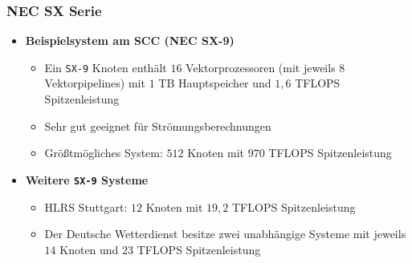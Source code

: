 \subsubsection{NEC SX Serie}
\begin{itemize}
	\item \textbf{Beispielsystem am SCC (NEC SX-9)}
	\begin{itemize}
		\item Ein \texttt{SX-9} Knoten enthält \(16\) Vektorprozessoren (mit jeweils \(8\) Vektorpipelines) mit \(1\) TB Hauptspeicher und \(1,6\) TFLOPS Spitzenleistung
		\item Sehr gut geeignet für Strömungsberechnungen
		\item Größtmögliches System: \(512\) Knoten mit \(970\) TFLOPS Spitzenleistung
	\end{itemize}
	\item \textbf{Weitere \texttt{SX-9} Systeme}
	\begin{itemize}
		\item HLRS Stuttgart: \(12\) Knoten mit \(19,2\) TFLOPS Spitzenleistung
		\item Der Deutsche Wetterdienst besitze zwei unabhängige Systeme mit jeweils \(14\) Knoten und \(23\) TFLOPS Spitzenleistung
	\end{itemize}
\end{itemize}


